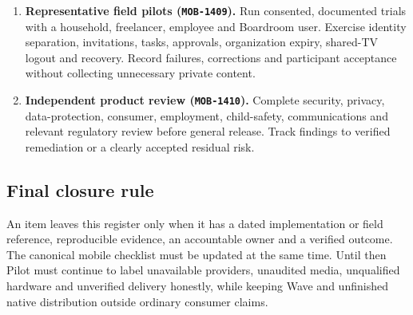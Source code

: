 \begin{enumerate}
  \item \textbf{Representative field pilots (\texttt{MOB-1409}).} Run consented,
  documented trials with a household, freelancer, employee and Boardroom user.
  Exercise identity separation, invitations, tasks, approvals, organization expiry,
  shared-TV logout and recovery.  Record failures, corrections and participant
  acceptance without collecting unnecessary private content.

  \item \textbf{Independent product review (\texttt{MOB-1410}).} Complete security,
  privacy, data-protection, consumer, employment, child-safety, communications and
  relevant regulatory review before general release.  Track findings to verified
  remediation or a clearly accepted residual risk.
\end{enumerate}

\subsection{Final closure rule}

An item leaves this register only when it has a dated implementation or field
reference, reproducible evidence, an accountable owner and a verified outcome.  The
canonical mobile checklist must be updated at the same time.  Until then Pilot must
continue to label unavailable providers, unaudited media, unqualified hardware and
unverified delivery honestly, while keeping Wave and unfinished native distribution
outside ordinary consumer claims.
